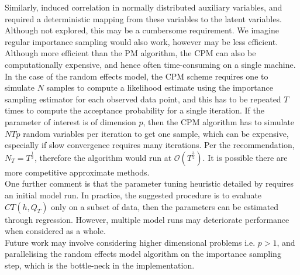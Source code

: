 \documentclass{article}
\begin{document}
Similarly, \cite{cpmmDeligiannidis2015} induced correlation in normally distributed auxiliary variables, and required a deterministic mapping from these variables to the latent variables. Although not explored, this may be a cumbersome requirement. We imagine regular importance sampling would also work, however may be less efficient. \\

Although more efficient than the PM algorithm, the CPM can also be computationally expensive, and hence often time-consuming on a single machine. In the case of the random effects model, the CPM scheme requires one to simulate $N$ samples to compute a likelihood estimate using the importance sampling estimator for each observed data point, and this has to be repeated $T$ times to compute the acceptance probability for a single iteration. If the parameter of interest is of dimension $p$, then the CPM algorithm has to simulate $NTp$ random variables per iteration to get one sample, which can be expensive, especially if slow convergence requires many iterations. Per the recommendation, $N_T =T^{\frac{1}{2}}$, therefore the algorithm would run at $\mathcal{O}(T^{\frac{3}{2}})$. It is possible there are more competitive approximate methods.\\

One further comment is that the parameter tuning heuristic detailed by \cite{cpmmDeligiannidis2015} requires an initial model run. In practice, the suggested procedure is to evaluate $CT(h, Q_{T})$ only on a subset of data, then the parameters can be estimated through regression. However, multiple model runs may deteriorate performance when considered as a whole.\\

Future work may involve considering higher dimensional problems i.e. $p>1$, and parallelising the random effects model algorithm on the importance sampling step, which is the bottle-neck in the implementation.



\end{document}
